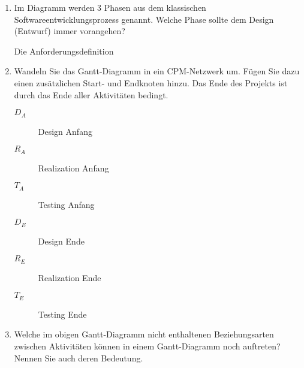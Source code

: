 \documentclass{lehramt-informatik-aufgabe}
\begin{document}
\begin{enumerate}


\item Im Diagramm werden 3 Phasen aus dem klassischen
Softwareentwicklungsprozess genannt. Welche Phase sollte dem Design
(Entwurf) immer vorangehen?

\begin{liAntwort}
Die Anforderungsdefinition
\end{liAntwort}


\item Wandeln Sie das Gantt-Diagramm in ein CPM-Netzwerk um. Fügen Sie
dazu einen zusätzlichen Start- und Endknoten hinzu. Das Ende des
Projekts ist durch das Ende aller Aktivitäten bedingt.

\begin{liAntwort}
\begin{description}
\item[$D_A$] Design Anfang
\item[$R_A$] Realization Anfang
\item[$T_A$] Testing Anfang
\item[$D_E$] Design Ende
\item[$R_E$] Realization Ende
\item[$T_E$] Testing Ende

\end{description}

\begin{center}
\end{center}
\end{liAntwort}

\item Welche im obigen Gantt-Diagramm nicht enthaltenen Beziehungsarten
zwischen Aktivitäten können in einem Gantt-Diagramm noch auftreten?
Nennen Sie auch deren Bedeutung.


\end{enumerate}
\end{document}
